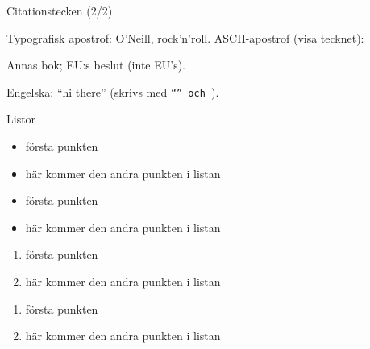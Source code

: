 \begin{Slide}{Citationstecken (2/2)}


\begin{exlatex}
Typografisk apostrof: O\textquoteright{}Neill, rock\textquoteright n\textquoteright{}roll.
ASCII-apostrof (visa tecknet): \textquotesingle

Annas bok; EU:s beslut (inte EU\textquoteright s).

Engelska: \enquote{hi there} (skrivs med \texttt{\enquote{} och \texttt{}}).
\end{exlatex}

\end{Slide}


\begin{Slide}{Listor}\SlideFontSmall
  

  \begin{exlatex}
\begin{itemize}
  \item första punkten
  \item här kommer den andra
  punkten i listan
\end{itemize}
  \end{exlatex}
\begin{itemize}
  \item första punkten
  \item här kommer den andra
  punkten i listan
\end{itemize}

  \blankline
  \begin{exlatex}
\begin{enumerate}
  \item första punkten
  \item här kommer den andra
  punkten i listan
\end{enumerate}
  \end{exlatex}
\begin{enumerate}
  \item första punkten
  \item här kommer den andra
  punkten i listan
\end{enumerate}

\end{Slide}

